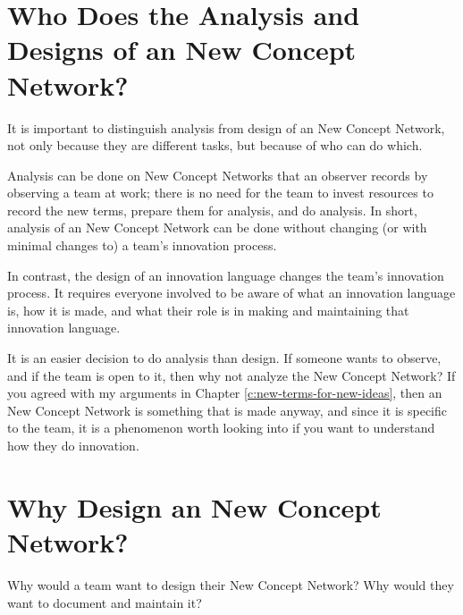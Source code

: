 \documentclass[graybox,envcountchap,sectrefs]{svmono}
\newcommand{\ncnf}{New Concept Network}
\begin{document}
\section{Who Does the Analysis and Designs of an \ncnf?}
\label{c2:s2}
It is important to distinguish analysis from design of an \ncnf, not only because they are different tasks, but because of who can do which. 

Analysis can be done on \ncnf s that an observer records by observing a team at work; there is no need for the team to invest resources to record the new terms, prepare them for analysis, and do analysis. In short, analysis of an \ncnf{} can be done without changing (or with minimal changes to) a team's innovation process. 

In contrast, the design of an innovation language changes the team's innovation process. It requires everyone involved to be aware of what an innovation language is, how it is made, and what their role is in making and maintaining that innovation language. 

It is an easier decision to do analysis than design. If someone wants to observe, and if the team is open to it, then why not analyze the \ncnf? If you agreed with my arguments in Chapter \ref{c:new-terms-for-new-ideas}, then an \ncnf{} is something that is made anyway, and since it is specific to the team, it is a phenomenon worth looking into if you want to understand how they do innovation.

\section{Why Design an \ncnf?}
\label{c2:s3}
Why would a team want to design their \ncnf? Why would they want to document and maintain it? 
\end{document}
